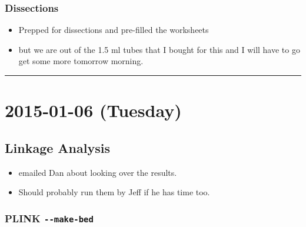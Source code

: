 \documentclass[letterpaper]{scrartcl}
\begin{document}
\subsubsection{Dissections}\label{dissections}

\begin{itemize}
\itemsep1pt\parskip0pt
\item
  Prepped for dissections and pre-filled the worksheets
\item
  but we are out of the 1.5 ml tubes that I bought for this and I will
  have to go get some more tomorrow morning.
\end{itemize}

\begin{center}\rule{0.5\linewidth}{\linethickness}\end{center}

\section{2015-01-06 (Tuesday)}\label{tuesday}

\subsection{Linkage Analysis}\label{linkage-analysis-3}

\begin{itemize}
\itemsep1pt\parskip0pt
\item
  emailed Dan about looking over the results.
\item
  Should probably run them by Jeff if he has time too.
\end{itemize}

\subsubsection{PLINK \texttt{-\/-make-bed}}\label{plink---make-bed}
\end{document}

